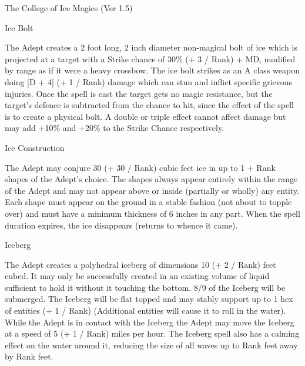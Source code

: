 \begin{Chapter}{The College of Ice Magics (Ver 1.5)}
\begin{spell}[S-7]{Ice Bolt}
\begin{effects}
The Adept creates a 2 foot long, 2 inch diameter non-magical bolt of
ice which is projected at a target with a Strike chance of 30\% (+ 3 /
Rank) + MD, modified by range as if it were a heavy crossbow.  The ice
bolt strikes as an A class weapon doing [D + 4] (+ 1 / Rank) damage
which can stun and inflict specific grievous injuries. Once the spell
is cast the target gets no magic resistance, but the target’s defence
is subtracted from the chance to hit, since the effect of the spell is
to create a physical bolt.  A double or triple effect cannot affect
damage but may add +10\% and +20\% to the Strike Chance respectively.
\end{effects}
\end{spell}

\begin{spell}[S-8]{Ice Construction}
\begin{effects}
The Adept may conjure 30 (+ 30 / Rank) cubic feet ice in up to 1 +
Rank shapes of the Adept’s choice. The shapes always appear entirely
within the range of the Adept and may not appear above or inside
(partially or wholly) any entity.  Each shape must appear on the
ground in a stable fashion (not about to topple over) and must have a
minimum thickness of 6 inches in any part. When the spell duration
expires, the ice disappears (returns to whence it came).
\end{effects}
\end{spell}

\begin{spell}[S-9]{Iceberg}

\begin{effects}
The Adept creates a polyhedral iceberg of dimensions 10 (+ 2 / Rank)
feet cubed. It may only be successfully created in an existing volume
of liquid sufficient to hold it without it touching the bottom. 8/9 of
the Iceberg will be submerged. The Iceberg will be flat topped and may
stably support up to 1 hex of entities (+ 1 / Rank) (Additional
entities will cause it to roll in the water). While the Adept is in
contact with the Iceberg the Adept may move the Iceberg at a speed of
5 (+ 1 / Rank) miles per hour.  The Iceberg spell also has a calming
effect on the water around it, reducing the size of all waves up to
Rank feet away by Rank feet.
\end{effects}
\end{spell}


\end{Chapter}
